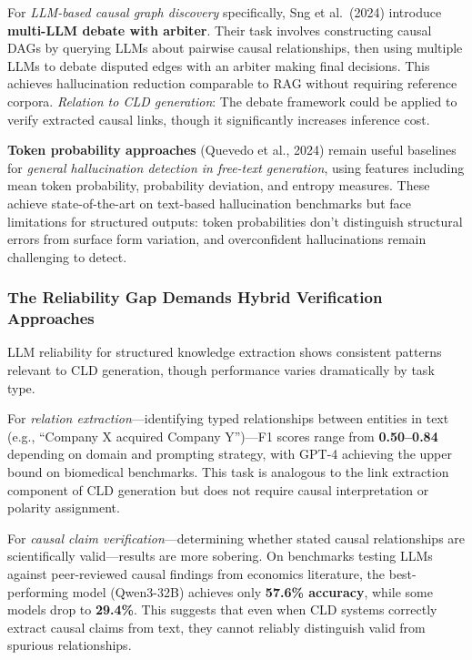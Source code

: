 For \textit{LLM-based causal graph discovery} specifically, Sng et al.\ (2024) introduce \textbf{multi-LLM debate with arbiter}. Their task involves constructing causal DAGs by querying LLMs about pairwise causal relationships, then using multiple LLMs to debate disputed edges with an arbiter making final decisions. This achieves hallucination reduction comparable to RAG without requiring reference corpora. \textit{Relation to CLD generation}: The debate framework could be applied to verify extracted causal links, though it significantly increases inference cost.

\textbf{Token probability approaches} (Quevedo et al., 2024) remain useful baselines for \textit{general hallucination detection in free-text generation}, using features including mean token probability, probability deviation, and entropy measures. These achieve state-of-the-art on text-based hallucination benchmarks but face limitations for structured outputs: token probabilities don't distinguish structural errors from surface form variation, and overconfident hallucinations remain challenging to detect.

\subsubsection{The Reliability Gap Demands Hybrid Verification Approaches}

LLM reliability for structured knowledge extraction shows consistent patterns relevant to CLD generation, though performance varies dramatically by task type.

For \textit{relation extraction}---identifying typed relationships between entities in text (e.g., ``Company X acquired Company Y'')---F1 scores range from \textbf{0.50--0.84} depending on domain and prompting strategy, with GPT-4 achieving the upper bound on biomedical benchmarks. This task is analogous to the link extraction component of CLD generation but does not require causal interpretation or polarity assignment.

For \textit{causal claim verification}---determining whether stated causal relationships are scientifically valid---results are more sobering. On benchmarks testing LLMs against peer-reviewed causal findings from economics literature, the best-performing model (Qwen3-32B) achieves only \textbf{57.6\% accuracy}, while some models drop to \textbf{29.4\%}. This suggests that even when CLD systems correctly extract causal claims from text, they cannot reliably distinguish valid from spurious relationships.

